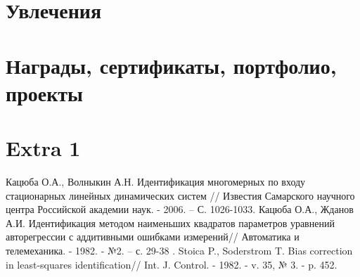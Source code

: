 \documentclass[14pt,a4paper]{moderncv}
\makeatletter
\renewcommand*{\bibliographyitemlabel}{\@biblabel{\arabic{enumiv}}}
\makeatother
\begin{document}
\section{Увлечения}

\section{Награды, сертификаты, портфолио, проекты}


\section{Extra 1}



%


\begin{thebibliography}{99}
Кацюба О.А., Волныкин А.Н. Идентификация многомерных по входу стационарных линейных динамических систем // Известия Самарского научного центра Российской академии наук. - 2006. – С. 1026-1033.
Кацюба О.А., Жданов А.И. Идентификация методом наименьших квадратов параметров уравнений авторегрессии с аддитивными ошибками измерений// Автоматика и телемеханика. - 1982. - №2. – с. 29-38 .
Stoica P., Soderstrom T. Bias correction in least-squares identification// Int. J. Control. - 1982. - v. 35, № 3. - p. 452.
\end{thebibliography}
\end{document}
